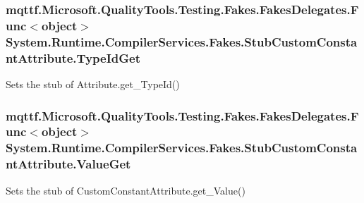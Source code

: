 \hypertarget{class_system_1_1_runtime_1_1_compiler_services_1_1_fakes_1_1_stub_custom_constant_attribute_a3a27b7afdadfb2381bd3310bd6d4aa97}{
\subsubsection[{Type\-Id\-Get}]{\setlength{\rightskip}{0pt plus 5cm}mqttf.\-Microsoft.\-Quality\-Tools.\-Testing.\-Fakes.\-Fakes\-Delegates.\-Func$<$object$>$ System.\-Runtime.\-Compiler\-Services.\-Fakes.\-Stub\-Custom\-Constant\-Attribute.\-Type\-Id\-Get}}\label{class_system_1_1_runtime_1_1_compiler_services_1_1_fakes_1_1_stub_custom_constant_attribute_a3a27b7afdadfb2381bd3310bd6d4aa97}


Sets the stub of Attribute.\-get\-\_\-\-Type\-Id()

\hypertarget{class_system_1_1_runtime_1_1_compiler_services_1_1_fakes_1_1_stub_custom_constant_attribute_aac03e538078f679d1e3add9317655200}{
\subsubsection[{Value\-Get}]{\setlength{\rightskip}{0pt plus 5cm}mqttf.\-Microsoft.\-Quality\-Tools.\-Testing.\-Fakes.\-Fakes\-Delegates.\-Func$<$object$>$ System.\-Runtime.\-Compiler\-Services.\-Fakes.\-Stub\-Custom\-Constant\-Attribute.\-Value\-Get}}\label{class_system_1_1_runtime_1_1_compiler_services_1_1_fakes_1_1_stub_custom_constant_attribute_aac03e538078f679d1e3add9317655200}


Sets the stub of Custom\-Constant\-Attribute.\-get\-\_\-\-Value()



